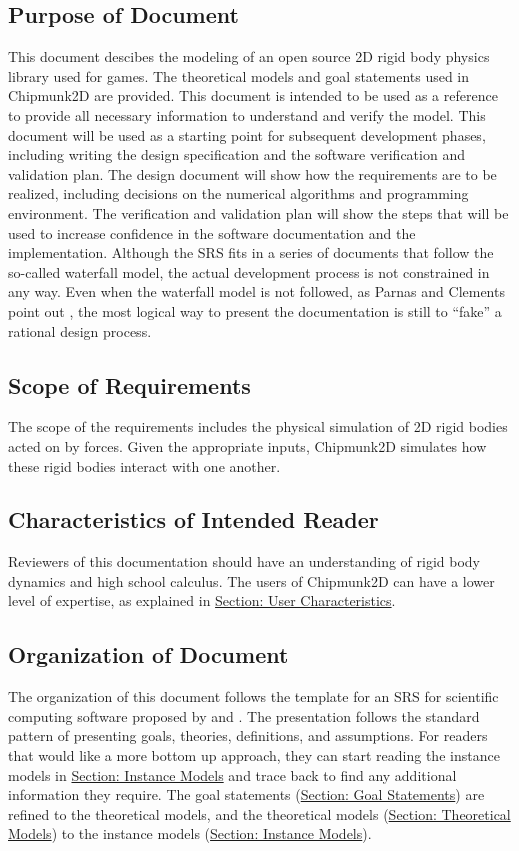 \documentclass[12pt]{article}
\begin{document}
\subsection{Purpose of Document}
\label{Sec:DocPurpose}
This document descibes the modeling of an open source 2D rigid body physics library used for games. The theoretical models and goal statements used in Chipmunk2D are provided. This document is intended to be used as a reference to provide all necessary information to understand and verify the model.
This document will be used as a starting point for subsequent development phases, including writing the design specification and the software verification and validation plan. The design document will show how the requirements are to be realized, including decisions on the numerical algorithms and programming environment. The verification and validation plan will show the steps that will be used to increase confidence in the software documentation and the implementation. Although the SRS fits in a series of documents that follow the so-called waterfall model, the actual development process is not constrained in any way. Even when the waterfall model is not followed, as Parnas and Clements point out \cite{parnasClements1986}, the most logical way to present the documentation is still to ``fake'' a rational design process.
\subsection{Scope of Requirements}
\label{Sec:ReqsScope}
The scope of the requirements includes the physical simulation of 2D rigid bodies acted on by forces. Given the appropriate inputs, Chipmunk2D simulates how these rigid bodies interact with one another.
\subsection{Characteristics of Intended Reader}
\label{Sec:ReaderChars}
Reviewers of this documentation should have an understanding of rigid body dynamics and high school calculus. The users of Chipmunk2D can have a lower level of expertise, as explained in \hyperref[Sec:UserChars]{Section: User Characteristics}.
\subsection{Organization of Document}
\label{Sec:DocOrg}
The organization of this document follows the template for an SRS for scientific computing software proposed by \cite{dParnas1972} and \cite{parnasClements1984}. The presentation follows the standard pattern of presenting goals, theories, definitions, and assumptions. For readers that would like a more bottom up approach, they can start reading the instance models in \hyperref[Sec:IMs]{Section: Instance Models} and trace back to find any additional information they require.
The goal statements (\hyperref[Sec:GoalStmt]{Section: Goal Statements}) are refined to the theoretical models, and the theoretical models (\hyperref[Sec:TMs]{Section: Theoretical Models}) to the instance models (\hyperref[Sec:IMs]{Section: Instance Models}).
\end{document}

